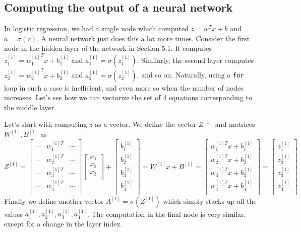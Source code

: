 \documentclass{article}[a4paper,12pt]
\theoremstyle{definition}
\begin{document}
\subsection{Computing the output of a neural network}
In logistic regression, we had a single node which computed $z=w^Tx+b$ and $a=\sigma(z)$. A neural network just does this a lot more times.
\vspace{6pt}
Consider the first node in the hidden layer of the network in Section 5.1. It computes $z_1^{[1]}={w_1^{[1]}}^Tx+b_1^{[1]}$ and $a_1^{[1]}=\sigma(z_1^{[1]})$. Similarly, the second layer computes $z_2^{[1]}={w_2^{[1]}}^Tx+b_2^{[1]}$ and $a_2^{[1]}=\sigma(z_2^{[1]})$, and so on. Naturally, using a \texttt{for} loop in such a case is inefficient, and even more so when the number of nodes increases. Let's see how we can vectorize the set of 4 equations corresponding to the middle layer. 
\vspace{6pt}

Let's start with computing $z$ as a vector. We define the vector $Z^{[1]}$ and matrices $W^{[1]},B^{[1]}$ as
$$Z^{[1]}=
\begin{bmatrix}
	\cdots & w_1^{[1]T} & \cdots\\
	\cdots & w_2^{[1]T} & \cdots\\
	\cdots & w_3^{[1]T} & \cdots\\
	\cdots & w_4^{[1]T} & \cdots\\
\end{bmatrix}
\begin{bmatrix}
	x_1\\
	x_2\\
	x_3\\
\end{bmatrix} 
 +
\begin{bmatrix}
	b_1^{[1]}\\
	b_2^{[1]}\\
	b_3^{[1]}\\
	b_4^{[1]}\\
\end{bmatrix}= W^{[1]}x+B^{[1]}=
\begin{bmatrix}
	w_1^{[1]T}x+b_1^{[1]}\\
	w_2^{[1]T}x+b_2^{[1]}\\
	w_3^{[1]T}x+b_3^{[1]}\\
	w_4^{[1]T}x+b_4^{[1]}\\
\end{bmatrix}=
\begin{bmatrix}
	z_1^{[1]}\\
	z_2^{[1]}\\
	z_3^{[1]}\\
	z_4^{[1]}\\
\end{bmatrix}
$$
Finally we define another vector $A^{[1]}=\sigma(Z^{[1]})$ which simply stacks up all the values $a_1^{[1]},a_2^{[1]},a_3^{[1]},a_4^{[1]}$. The computation in the final node is very similar, except for a change in the layer index.
\end{document}

